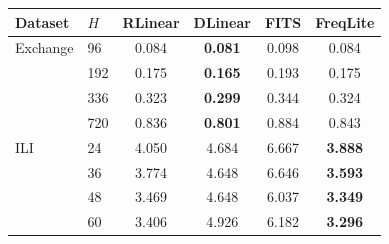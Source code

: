 \begin{tabular}{llcccc}
\toprule
Dataset & $H$ & RLinear & DLinear & FITS & FreqLite \\
\midrule
Exchange & 96 & 0.084 & \textbf{0.081} & 0.098 & 0.084 \\
 & 192 & 0.175 & \textbf{0.165} & 0.193 & 0.175 \\
 & 336 & 0.323 & \textbf{0.299} & 0.344 & 0.324 \\
 & 720 & 0.836 & \textbf{0.801} & 0.884 & 0.843 \\
\midrule
ILI & 24 & 4.050 & 4.684 & 6.667 & \textbf{3.888} \\
 & 36 & 3.774 & 4.648 & 6.646 & \textbf{3.593} \\
 & 48 & 3.469 & 4.648 & 6.037 & \textbf{3.349} \\
 & 60 & 3.406 & 4.926 & 6.182 & \textbf{3.296} \\
\bottomrule
\end{tabular}